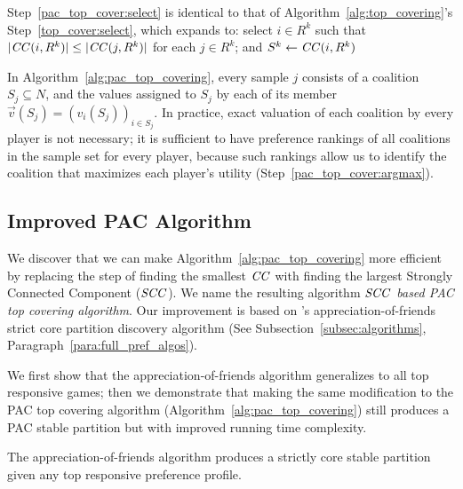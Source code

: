 Step~\ref{pac_top_cover:select} is identical to that of
Algorithm~\ref{alg:top_covering}'s Step~\ref{top_cover:select}, which expands to:
select $i\in R^k$ such that $|\mathit{CC}(i,R^k)| \leq |\mathit{CC}(j,R^k)|$ for each $j\in R^k$;
and $S^k\leftarrow \mathit{CC}(i,R^k)$

In Algorithm~\ref{alg:pac_top_covering}, every sample $j$ consists of a coalition
$S_j \subseteq N$, and the values assigned to $S_j$ by each of its member
$\vec{v}(S_j) = (v_i(S_j))_{i \in S_j}$.
In practice, exact valuation of each coalition by every player is not necessary;
it is sufficient to have preference rankings of all coalitions in the sample set
for every player, because such rankings allow us to identify the coalition that
maximizes each player's utility (Step~\ref{pac_top_cover:argmax}).


\subsection{Improved PAC Algorithm}
\label{subsec:improved_pac_algorithm}
We discover that we can make Algorithm~\ref{alg:pac_top_covering} more efficient
by replacing the step of finding the smallest $\mathit{CC}$ with finding the largest
Strongly Connected Component ($\mathit{SCC}$).
We name the resulting algorithm \textit{$\mathit{SCC}$ based PAC top covering algorithm}.
Our improvement is based on 's appreciation-of-friends
strict core partition discovery algorithm (See Subsection~\ref{subsec:algorithms},
Paragraph~\ref{para:full_pref_algos}).

We first show that the appreciation-of-friends algorithm generalizes to all top
responsive games; then we demonstrate that making the same modification to the
PAC top covering algorithm (Algorithm~\ref{alg:pac_top_covering}) still produces
a PAC stable partition but with improved running time complexity.

\begin{proposition}
\label{prop:scc_generalizes}
  The appreciation-of-friends algorithm produces a strictly core stable partition
  given any top responsive preference profile.
\end{proposition}

